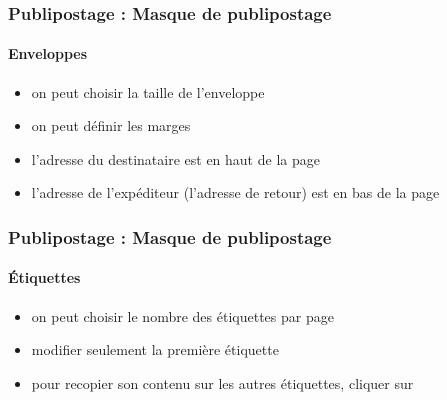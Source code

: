 \documentclass[xcolor=table]{beamer}
\begin{document}
\begin{frame}
\frametitle{Publipostage : Masque de publipostage}
\framesubtitle{Enveloppes}

\begin{minipage}{0.53\textwidth}
	\begin{itemize}
		\item on peut choisir la taille de l'enveloppe 
		\item on peut définir les marges 
		\item l'adresse du destinataire est en haut de la page
		\item l'adresse de l'expéditeur (l'adresse de retour) est en bas de la page
	\end{itemize}
\end{minipage}
\begin{minipage}{0.45\textwidth}
\end{minipage}

\end{frame}

\begin{frame}
\frametitle{Publipostage : Masque de publipostage}
\framesubtitle{Étiquettes}

\begin{minipage}{0.63\textwidth}
	\begin{itemize}
		\item on peut choisir le nombre des étiquettes par page
		\item modifier seulement la première étiquette 
		\item pour recopier son contenu sur les autres étiquettes, cliquer sur 
	\end{itemize}
\end{minipage}
\begin{minipage}{0.36\textwidth}
	
\end{minipage}

\end{frame}
\end{document}

